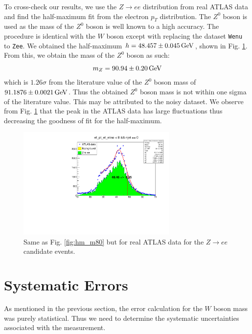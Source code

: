 \documentclass[a4paper]{report}
\numberwithin{equation}{section}
\begin{document}
To cross-check our results, we use the $Z \rightarrow ee$ distribution from real ATLAS data and find the half-maximum fit from 
the electron $p_T$ distribution. The $Z^0$ boson is used as the mass of the $Z^0$ boson is well known to a high accuracy. 
The procedure is identical with the $W$ boson except with replacing the dataset \texttt{Wenu} to 
\texttt{Zee}. We obtained the half-maximum $h = \SI{48.457 \pm 0.045}{\giga\electronvolt}$, shown in Fig. \ref{fig:hm_zee}. From this, 
we obtain the mass of the $Z^0$ boson as such: 
\begin{equation}
    m_Z = \SI{90.94 \pm 0.20}{\giga\electronvolt}
\end{equation}
which is $1.26\sigma$ from the literature value of the $Z^0$ boson mass of $\SI{91.1876 \pm 0.0021}{\giga\electronvolt}$. Thus the 
obtained $Z^0$ boson mass is not within one sigma of the literature value. This may be attributed to the noisy dataset. We observe from 
Fig. \ref{fig:hm_zee} that the peak in the ATLAS data has large fluctuations thus decreasing the goodness of fit for the half-maximum.

\begin{figure}[htpb]
    \centering
    \includegraphics[width=0.7\textwidth]{hm_zee.pdf}
    \caption{Same as Fig. \ref{fig:hm_m80} but for real ATLAS data for the $Z \rightarrow ee$ candidate events.}
    \label{fig:hm_zee}
\end{figure}

\section{Systematic Errors}

As mentioned in the previous section, the error calculation for the $W$ boson mass was purely statistical. Thus we need to determine 
the systematic uncertainties associated with the measurement. 
\end{document}
